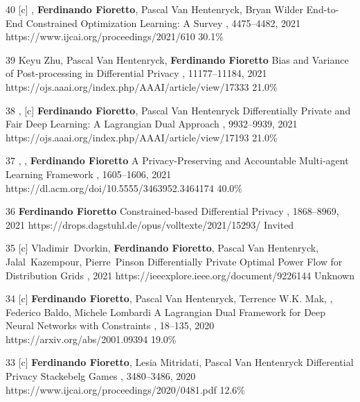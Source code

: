 \begin{pubs}
\confentry 
	{40} %
	{[c] , {\bf Ferdinando Fioretto}, Pascal Van Hentenryck, Bryan Wilder}
	{End-to-End Constrained Optimization Learning: A Survey}
	{\procIJCAI, 4475--4482, 2021}
	{https://www.ijcai.org/proceedings/2021/610}
	{30.1\%}

\confentry 
	{39} %
	{Keyu Zhu, Pascal Van Hentenryck, {\bf Ferdinando Fioretto}}
	{Bias and Variance of Post-processing in Differential Privacy}
	{\procAAAI, 11177--11184, 2021}
	{https://ojs.aaai.org/index.php/AAAI/article/view/17333}
    {21.0\%} %

\confentry 
	{38} %
	{, [c] {\bf Ferdinando Fioretto}, Pascal Van Hentenryck}
	{Differentially Private and Fair Deep Learning: A Lagrangian Dual Approach}
	{\procAAAI, 9932--9939, 2021}
	{https://ojs.aaai.org/index.php/AAAI/article/view/17193}
    {21.0\%} %

\confentry
    {37} %
    {, , {\bf Ferdinando Fioretto}}
    {A Privacy-Preserving and Accountable Multi-agent Learning Framework}
    {\procAAMAS, 1605--1606, 2021}
    {https://dl.acm.org/doi/10.5555/3463952.3464174}
    {40.0\%}

\confentry
	{36} %
	{\bf Ferdinando Fioretto}
	{Constrained-based Differential Privacy}
	{\procCP, 1868--8969, 2021}
	{https://drops.dagstuhl.de/opus/volltexte/2021/15293/}
	{Invited}

\confentry 
	{35} %
	{[c] Vladimir~Dvorkin, {\bf Ferdinando Fioretto}, Pascal Van Hentenryck, Jalal~Kazempour, Pierre~Pinson}
	{Differentially Private Optimal Power Flow for Distribution Grids}
	{, 2021}
	{https://ieeexplore.ieee.org/document/9226144}
	{Unknown} %

\confentry
		{34} %
		{[c] {\bf Ferdinando Fioretto}, Pascal Van Hentenryck, Terrence W.K. Mak, , Federico Baldo, Michele Lombardi} 
		{A Lagrangian Dual Framework for Deep Neural Networks with Constraints}
		{\procECML, 18--135, 2020}
		{https://arxiv.org/abs/2001.09394}
		{19.0\%}

	\confentry
		{33} %
		{[c] {\bf Ferdinando Fioretto}, Lesia Mitridati, Pascal Van Hentenryck}
		{Differential Privacy Stackebelg Games}
		{\procIJCAI, 3480--3486, 2020}
		{https://www.ijcai.org/proceedings/2020/0481.pdf}
	    {12.6\%}


\end{pubs}
